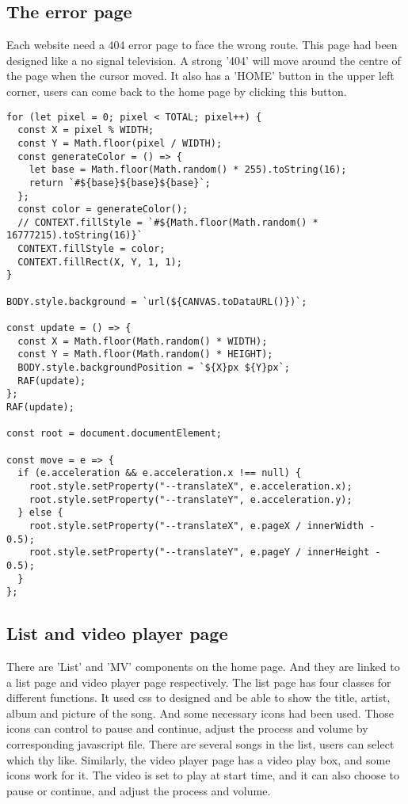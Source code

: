 \documentclass[10pt, a4paper]{article}
\begin{document}
	\subsection{The error page}
    Each website need a 404 error page to face the wrong route. This page had been designed like a no signal television. A strong '404' will move around the centre of the page when the cursor moved. It also has a 'HOME' button in the upper left corner, users can come back to the home page by clicking this button.
    \begin{lstlisting}[caption = Hello World! in ]
for (let pixel = 0; pixel < TOTAL; pixel++) {
  const X = pixel % WIDTH;
  const Y = Math.floor(pixel / WIDTH);
  const generateColor = () => {
    let base = Math.floor(Math.random() * 255).toString(16);
    return `#${base}${base}${base}`;
  };
  const color = generateColor();
  // CONTEXT.fillStyle = `#${Math.floor(Math.random() * 16777215).toString(16)}`
  CONTEXT.fillStyle = color;
  CONTEXT.fillRect(X, Y, 1, 1);
}

BODY.style.background = `url(${CANVAS.toDataURL()})`;

const update = () => {
  const X = Math.floor(Math.random() * WIDTH);
  const Y = Math.floor(Math.random() * HEIGHT);
  BODY.style.backgroundPosition = `${X}px ${Y}px`;
  RAF(update);
};
RAF(update);

const root = document.documentElement;

const move = e => {
  if (e.acceleration && e.acceleration.x !== null) {
    root.style.setProperty("--translateX", e.acceleration.x);
    root.style.setProperty("--translateY", e.acceleration.y);
  } else {
    root.style.setProperty("--translateX", e.pageX / innerWidth - 0.5);
    root.style.setProperty("--translateY", e.pageY / innerHeight - 0.5);
  }
};

\end{lstlisting}
	
	\subsection{List and video player page}
	There are 'List' and 'MV' components on the home page. And they are linked to a list page and video player page respectively. The list page has four classes for different functions. It used css to designed and be able to show the title, artist, album and picture of the song. And some necessary icons had been used. Those icons can control to pause and continue, adjust the process and volume by corresponding javascript file. There are several songs in the list, users can select which thy like. Similarly, the video player page has a video play box, and some icons work for it. The video is set to play at start time, and it can also choose to pause or continue, and adjust the process and volume.
    
\end{document}
